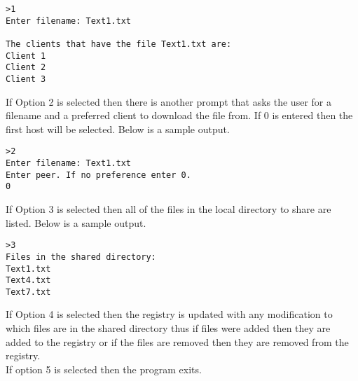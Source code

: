 \documentclass{article}
\begin{document}
\begin{verbatim}
>1
Enter filename: Text1.txt

The clients that have the file Text1.txt are:
Client 1
Client 2
Client 3
\end{verbatim}

If Option 2 is selected then there is another prompt that asks the user for a filename and a preferred client to download the file from. If 0 is entered then the first host will be selected. Below is a sample output.

\begin{verbatim}
>2
Enter filename: Text1.txt
Enter peer. If no preference enter 0.
0
\end{verbatim}

If Option 3 is selected then all of the files in the local directory to share are listed. Below is a sample output. 

\begin{verbatim}
>3
Files in the shared directory:
Text1.txt
Text4.txt
Text7.txt
\end{verbatim}

If Option 4 is selected then the registry is updated with any modification to which files are in the shared directory thus if files were added then they are added to the registry or if the files are removed then they are removed from the registry. \\

If option 5 is selected then the program exits. 
\end{document}
